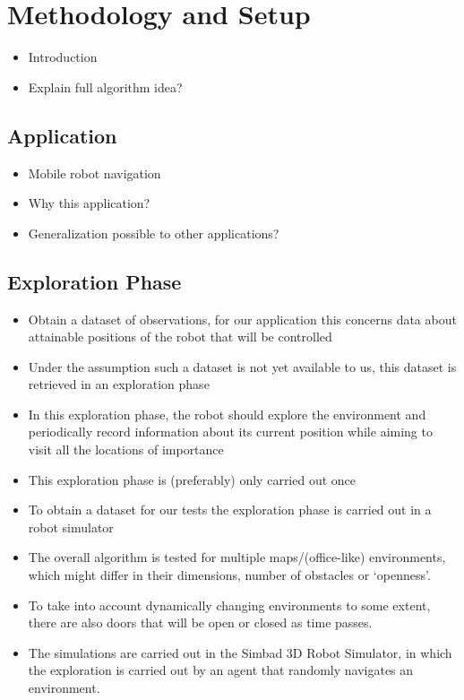 \chapter{Methodology and Setup}
\label{ch:setup}

% 

\begin{itemize}
	\item Introduction
	\item Explain full algorithm idea?
\end{itemize}

\section{Application}
\label{sec:application}

% 

\begin{itemize}
	\item Mobile robot navigation
	\item Why this application?
	\item Generalization possible to other applications?
\end{itemize}

\section{Exploration Phase}
\label{sec:exploration-phase}

% 

\begin{itemize}
	\item Obtain a dataset of observations, for our application this concerns data about attainable positions of the robot that will be controlled
	\item Under the assumption such a dataset is not yet available to us, this dataset is retrieved in an exploration phase
	\item In this exploration phase, the robot should explore the environment and periodically record information about its current position while aiming to visit all the locations of importance
	\item This exploration phase is (preferably) only carried out once
	\item To obtain a dataset for our tests the exploration phase is carried out in a robot simulator
	\item The overall algorithm is tested for multiple maps/(office-like) environments, which might differ in their dimensions, number of obstacles or `openness'.
	\item To take into account dynamically changing environments to some extent, there are also doors that will be open or closed as time passes.
	\item The simulations are carried out in the Simbad 3D Robot Simulator, in which the exploration is carried out by an agent that randomly navigates an environment.
\end{itemize}

